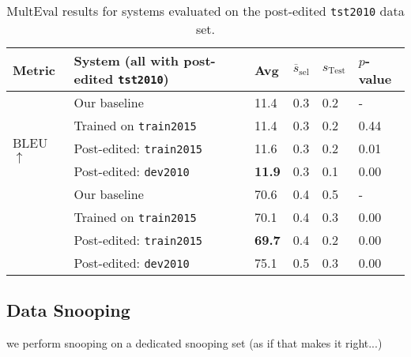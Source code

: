 {\begin{table}[htb]
\begin{center}
\begin{tabular}{|l|l|l|l|l|l|}
\hline
\bf Metric & \bf System (all with post-edited {\small \tt tst2010}) & \bf Avg & \bf $\overline{s}_{\text{sel}}$ & \bf $s_{\text{Test}}$ & \bf $p$-value \\
\hline
\multirow{5}{*}{BLEU $\uparrow$}
& Our baseline & 11.4 & 0.3 & 0.2 & - \\
& Trained on {\small \tt train2015} & 11.4 & 0.3 & 0.2 & 0.44 \\
& Post-edited: {\small \tt train2015} & 11.6 & 0.3 & 0.2 & 0.01 \\
& Post-edited: {\small \tt dev2010} & \textbf{11.9} & 0.3 & 0.1 & 0.00 \\
\hline
\multirow{5}{*}{TER $\downarrow$}
& Our baseline & 70.6 & 0.4 & 0.5 & - \\
& Trained on {\small \tt train2015} & 70.1 & 0.4 & 0.3 & 0.00 \\
& Post-edited: {\small \tt train2015} & \textbf{69.7} & 0.4 & 0.2 & 0.00 \\
& Post-edited: {\small \tt dev2010} & 75.1 & 0.5 & 0.3 & 0.00 \\
\hline
\end{tabular}
\end{center}

\caption{\label{tab:multeval_tst2010-fixed} %
MultEval results for systems evaluated on the post-edited {\small \tt tst2010} data set.
} %
\end{table}


\subsection{Data Snooping}
we perform snooping on a dedicated snooping set (as if that makes it right...)

}
